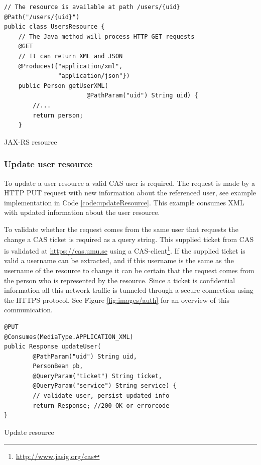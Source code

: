 \documentclass[titlepage, twocolumn, a4paper, 10pt]{article}
\begin{document}
\begin{code}
  \begin{footnotesize}
\begin{verbatim}
// The resource is available at path /users/{uid}
@Path("/users/{uid}")
public class UsersResource {
    // The Java method will process HTTP GET requests
    @GET
    // It can return XML and JSON
    @Produces({"application/xml",
               "application/json"})
    public Person getUserXML(
                       @PathParam("uid") String uid) {
        //...
        return person;
    }
\end{verbatim}
  \end{footnotesize}
  \caption{JAX-RS resource}\label{code:jaxrs}
\end{code}

\subsubsection{Update user resource}\label{sec:updateuser}
To update a user resource a valid CAS user is required. The request is made by a HTTP PUT request with new information about the referenced user, see example implementation in Code \ref{code:updateResource}. This example consumes XML with updated information about the user resource.

To validate whether the request comes from the same user that requests the change a CAS ticket is required as a query string. This supplied ticket from CAS is validated at \url{https://cas.umu.se} using a CAS-client\footnote{\url{http://www.jasig.org/cas}}. If the supplied ticket is valid a username can be extracted, and if this username is the same as the username of the resource to change it can be certain that the request comes from the person who is represented by the resource. Since a ticket is confidential information all this network traffic is tunneled through a secure connection using the HTTPS protocol. See Figure \ref{fig:images/auth} for an overview of this communication.

\begin{code}
  \begin{footnotesize}
\begin{verbatim}
@PUT
@Consumes(MediaType.APPLICATION_XML)
public Response updateUser(
        @PathParam("uid") String uid,
        PersonBean pb,
        @QueryParam("ticket") String ticket,
        @QueryParam("service") String service) {
        // validate user, persist updated info
        return Response; //200 OK or errorcode
}
\end{verbatim}
  \end{footnotesize}
  \caption{Update resource}\label{code:updateResource}
\end{code}
\end{document}
